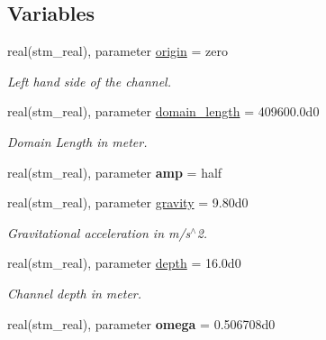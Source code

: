 \subsection*{Variables}
\begin{CompactItemize}
\item 
\hypertarget{a00075_ace3ff1fc926161c0767e4cf71ef4312}{
real(stm\_\-real), parameter \hyperlink{a00075_ace3ff1fc926161c0767e4cf71ef4312}{origin} = zero}
\label{a00075_ace3ff1fc926161c0767e4cf71ef4312}

\begin{CompactList}\small\item\em Left hand side of the channel. \item\end{CompactList}\item 
\hypertarget{a00075_a6e296389f1fbf10fb55683356df7be1}{
real(stm\_\-real), parameter \hyperlink{a00075_a6e296389f1fbf10fb55683356df7be1}{domain\_\-length} = 409600.0d0}
\label{a00075_a6e296389f1fbf10fb55683356df7be1}

\begin{CompactList}\small\item\em Domain Length in meter. \item\end{CompactList}\item 
\hypertarget{a00075_2b3ee0d2446b5421bec1fcfe8e8e1fde}{
real(stm\_\-real), parameter \textbf{amp} = half}
\label{a00075_2b3ee0d2446b5421bec1fcfe8e8e1fde}

\item 
\hypertarget{a00075_25f72425a266f85ce3c78fa73d64ac6f}{
real(stm\_\-real), parameter \hyperlink{a00075_25f72425a266f85ce3c78fa73d64ac6f}{gravity} = 9.80d0}
\label{a00075_25f72425a266f85ce3c78fa73d64ac6f}

\begin{CompactList}\small\item\em Gravitational acceleration in m/s$^\wedge$2. \item\end{CompactList}\item 
\hypertarget{a00075_b206455496b74bfe98d345daafd3e7c2}{
real(stm\_\-real), parameter \hyperlink{a00075_b206455496b74bfe98d345daafd3e7c2}{depth} = 16.0d0}
\label{a00075_b206455496b74bfe98d345daafd3e7c2}

\begin{CompactList}\small\item\em Channel depth in meter. \item\end{CompactList}\item 
\hypertarget{a00075_e16f52b0a564526244bf457adac0b088}{
real(stm\_\-real), parameter \textbf{omega} = 0.506708d0}
\label{a00075_e16f52b0a564526244bf457adac0b088}


\end{CompactItemize}
